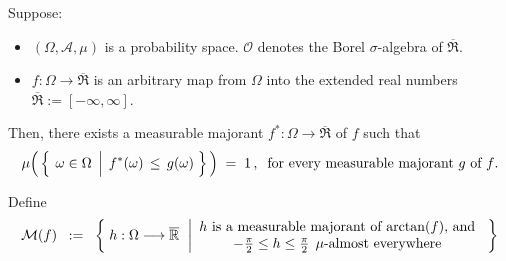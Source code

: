 \begin{theorem}
\mbox{}\vskip 0.1cm
\noindent
Suppose:
\begin{itemize}
\item
	$(\Omega,\mathcal{A},\mu)$ is a probability space.
	$\mathcal{O}$ denotes the Borel $\sigma$-algebra of $\overline{\Re}$.
\item
	$f : \Omega \longrightarrow \overline{\Re}$
	is an arbitrary map from $\Omega$ into the extended real numbers
	$\overline{\Re} := [-\infty,\infty]$.
\end{itemize}
Then, there exists a measurable majorant $f^{*} : \Omega \longrightarrow \overline{\Re}$ of $f$ such that
\begin{equation*}
\mu\!\left(\,\left\{\;\left.\omega\overset{{\color{white}.}}{\in}\Omega\;\,\right\vert\; f^{*}(\omega) \,\leq\, g(\omega)\;\right\}\,\right)
\;=\;1\,,\;\;
\textnormal{for every measurable majorant $g$ of $f$}.
\end{equation*}
\end{theorem}
\proof
Define
\begin{equation*}
\mathcal{M}(f)
\;\; := \;\;
	\left\{\;
		h : \Omega \longrightarrow \overline{\Re}
	\;\,\left\vert
		\begin{array}{c}
		\textnormal{$h$ is a measurable majorant of $\arctan(f)$, and}
		\\
		-\frac{\pi}{2} \leq h \leq \frac{\pi}{2} \;\, \mu\textnormal{-almost everywhere}
		\end{array}
	\right.
	\;\right\}
\end{equation*}

